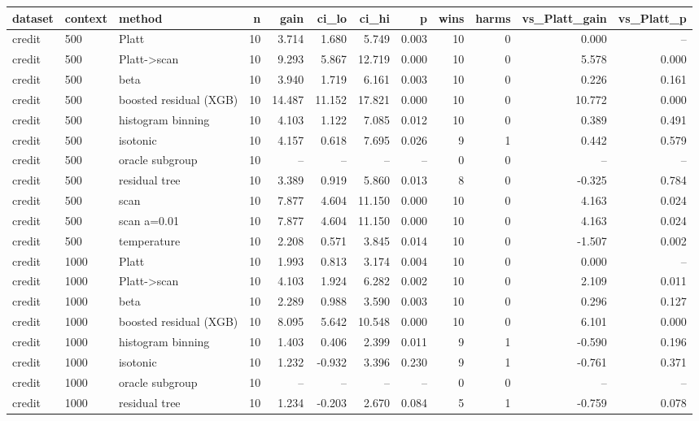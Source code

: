 \begin{tabular}{lllrrrrrrrrr}
\toprule
dataset & context & method & n & gain & ci_lo & ci_hi & p & wins & harms & vs_Platt_gain & vs_Platt_p \\
\midrule
credit & 500 & Platt & 10 & 3.714 & 1.680 & 5.749 & 0.003 & 10 & 0 & 0.000 & -- \\
credit & 500 & Platt->scan & 10 & 9.293 & 5.867 & 12.719 & 0.000 & 10 & 0 & 5.578 & 0.000 \\
credit & 500 & beta & 10 & 3.940 & 1.719 & 6.161 & 0.003 & 10 & 0 & 0.226 & 0.161 \\
credit & 500 & boosted residual (XGB) & 10 & 14.487 & 11.152 & 17.821 & 0.000 & 10 & 0 & 10.772 & 0.000 \\
credit & 500 & histogram binning & 10 & 4.103 & 1.122 & 7.085 & 0.012 & 10 & 0 & 0.389 & 0.491 \\
credit & 500 & isotonic & 10 & 4.157 & 0.618 & 7.695 & 0.026 & 9 & 1 & 0.442 & 0.579 \\
credit & 500 & oracle subgroup & 10 & -- & -- & -- & -- & 0 & 0 & -- & -- \\
credit & 500 & residual tree & 10 & 3.389 & 0.919 & 5.860 & 0.013 & 8 & 0 & -0.325 & 0.784 \\
credit & 500 & scan & 10 & 7.877 & 4.604 & 11.150 & 0.000 & 10 & 0 & 4.163 & 0.024 \\
credit & 500 & scan a=0.01 & 10 & 7.877 & 4.604 & 11.150 & 0.000 & 10 & 0 & 4.163 & 0.024 \\
credit & 500 & temperature & 10 & 2.208 & 0.571 & 3.845 & 0.014 & 10 & 0 & -1.507 & 0.002 \\
credit & 1000 & Platt & 10 & 1.993 & 0.813 & 3.174 & 0.004 & 10 & 0 & 0.000 & -- \\
credit & 1000 & Platt->scan & 10 & 4.103 & 1.924 & 6.282 & 0.002 & 10 & 0 & 2.109 & 0.011 \\
credit & 1000 & beta & 10 & 2.289 & 0.988 & 3.590 & 0.003 & 10 & 0 & 0.296 & 0.127 \\
credit & 1000 & boosted residual (XGB) & 10 & 8.095 & 5.642 & 10.548 & 0.000 & 10 & 0 & 6.101 & 0.000 \\
credit & 1000 & histogram binning & 10 & 1.403 & 0.406 & 2.399 & 0.011 & 9 & 1 & -0.590 & 0.196 \\
credit & 1000 & isotonic & 10 & 1.232 & -0.932 & 3.396 & 0.230 & 9 & 1 & -0.761 & 0.371 \\
credit & 1000 & oracle subgroup & 10 & -- & -- & -- & -- & 0 & 0 & -- & -- \\
credit & 1000 & residual tree & 10 & 1.234 & -0.203 & 2.670 & 0.084 & 5 & 1 & -0.759 & 0.078 \\

\end{tabular}
